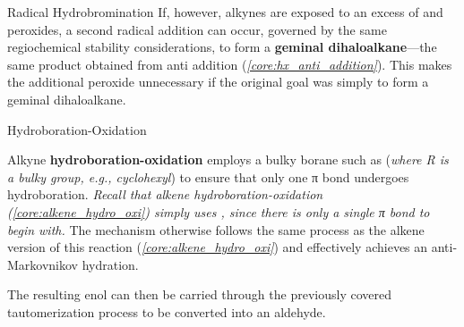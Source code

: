 \documentclass[10pt]{article}
\begin{document}
\begin{core}{Radical Hydrobromination}
        If, however, alkynes are exposed to an excess of  and peroxides, a second radical addition can occur, governed by the same regiochemical stability considerations, to form a \textbf{geminal dihaloalkane}---the same product obtained from  anti addition (\textit{\autoref{core:hx_anti_addition}}). This makes the additional peroxide unnecessary if the original goal was simply to form a geminal dihaloalkane.

      \end{core}

      \begin{core}{Hydroboration-Oxidation}

        Alkyne \textbf{hydroboration-oxidation} employs a bulky borane such as  (\textit{where R is a bulky group, e.g., cyclohexyl}) to ensure that only one π bond undergoes hydroboration. \textit{Recall that alkene hydroboration-oxidation (\autoref{core:alkene_hydro_oxi}) simply uses , since there is only a single π bond to begin with.} The mechanism otherwise follows the same process as the alkene version of this reaction (\textit{\autoref{core:alkene_hydro_oxi}}) and effectively achieves an anti-Markovnikov hydration.


        The resulting enol can then be carried through the previously covered tautomerization process to be converted into an aldehyde.



\end{core}
\end{document}

